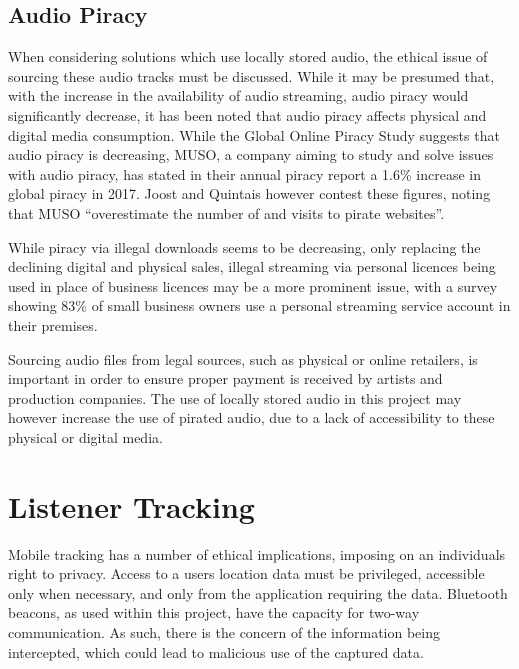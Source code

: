 \documentclass[11pt,a4paper,headinclude=false,footinclude=false]{scrreprt}
\begin{document}
\subsection{Audio Piracy}\label{audio-piracy}

When considering solutions which use locally stored audio, the ethical
issue of sourcing these audio tracks must be discussed. While it may be
presumed that, with the increase in the availability of audio streaming,
audio piracy would significantly decrease, it has been noted that audio
piracy affects physical and digital media
consumption\cite{onlinePiracy}. While the Global Online Piracy
Study\cite{onlinePiracy} suggests that audio piracy is decreasing, MUSO,
a company aiming to study and solve issues with audio piracy, has stated
in their annual piracy report a 1.6\% increase in global piracy in
2017\cite{muso}. Joost and Quintais however contest these figures,
noting that MUSO ``overestimate the number of and visits to pirate
websites''\cite{onlinePiracy}.

While piracy via illegal downloads seems to be decreasing, only
replacing the declining digital and physical sales\cite{SpotPay18},
illegal streaming via personal licences being used in place of business
licences may be a more prominent issue, with a survey showing 83\% of
small business owners use a personal streaming service account in their
premises\cite{licence}.

Sourcing audio files from legal sources, such as physical or online
retailers, is important in order to ensure proper payment is received by
artists and production companies. The use of locally stored audio in
this project may however increase the use of pirated audio, due to a
lack of accessibility to these physical or digital media.

\section{Listener Tracking}\label{listener-tracking}

Mobile tracking has a number of ethical implications, imposing on an
individuals right to privacy. Access to a users location data must be
privileged, accessible only when necessary, and only from the
application requiring the data. Bluetooth beacons, as used within this
project, have the capacity for two-way communication. As such, there is
the concern of the information being intercepted, which could lead to
malicious use of the captured data\cite{bleprivacy}.
\end{document}
